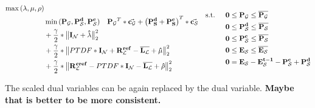 \begin{subequations}
	\begin{align}
		\max{(\lambda, \mu, \rho)} \label{eq:opt_admm_matrix_scaled}\\
		 & \min{(\vb{P_\mathcal{G}}, \vb{P_\mathcal{S}^d}, \vb{P_\mathcal{S}^c})} \quad \vb{P_\mathcal{G}}^T * \va{c_\mathcal{G}} + \left(\vb{P_S^d} + \vb{P_S^c}\right)^T * \va{c_\mathcal{S}} \nonumber \\
		 & + \frac{\gamma}{2} * \big\|\vb{I_\mathcal{N}} + \vb{\hat{\lambda}}\big\|_2^2 \nonumber \\
		 & + \frac{\gamma}{2} * \big\| PTDF * \vb{I_\mathcal{N}} + \vb{R_\mathcal{L}^{ref}} - \vb{\overline{L_\mathcal{L}}} + \vb{\hat{\mu}} \big\|_2^2 \nonumber \\
		 & + \frac{\gamma}{2} * \big\| \vb{R_\mathcal{L}^{cref}} - PTDF * \vb{I_\mathcal{N}} - \vb{\overline{L_\mathcal{L}}} + \vb{\hat{\rho}} \big\|_2^2 \nonumber
	\end{align}
		\begin{align}
		 \text{s.t. } \quad & \vb{0} \leq \vb{P_\mathcal{G}} \leq \vb{\overline{P_\mathcal{G}}} \\
		 & \vb{0} \leq \vb{P_\mathcal{S}^d} \leq \vb{\overline{P_\mathcal{S}}} \\
		 & \vb{0} \leq \vb{P_\mathcal{S}^c} \leq \vb{\overline{P_\mathcal{S}}} \\
		 & \vb{0} \leq \vb{E_\mathcal{S}} \leq \vb{\overline{E_\mathcal{S}}}\\
		 & \vb{0} = \vb{E_\mathcal{S}} - \vb{E_\mathcal{S}^{t-1}} - \vb{P_\mathcal{S}^c} + \vb{P_\mathcal{S}^d}
	\end{align}
\end{subequations}

The scaled dual variables can be again replaced by the dual variable. \textbf{Maybe that is better to be more consistent.}
